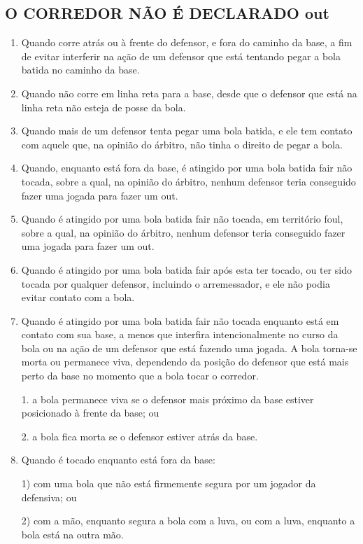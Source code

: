 \subsection{O CORREDOR NÃO É DECLARADO \gls{out}}
\begin{enumerate}[label=(\alph*)]
	\item   Quando corre atrás ou à frente do defensor, e fora do caminho da base, a fim de evitar interferir na ação de um defensor que está tentando pegar a bola batida no caminho da base.
	\item  Quando não corre em linha reta para a base, desde que o defensor que está na linha reta não esteja de posse da bola.
	\item  Quando mais de um defensor tenta pegar uma bola batida, e ele tem contato com aquele que, na opinião do árbitro, não tinha o direito de pegar a bola.
	\item  Quando, enquanto está fora da base, é atingido por uma bola batida \gls{fair} não tocada, sobre a qual, na opinião do árbitro, nenhum defensor teria conseguido fazer uma jogada para fazer um \gls{out}.
	\item  Quando é atingido por uma bola batida \gls{fair} não tocada, em território \gls{foul}, sobre a qual, na opinião do árbitro, nenhum defensor teria conseguido fazer uma jogada para fazer um \gls{out}.
	\item  Quando é atingido por uma bola batida \gls{fair} após esta ter tocado, ou ter sido tocada por qualquer defensor, incluindo o arremessador, e ele não podia evitar contato com a bola.
	\item   Quando é atingido por uma bola batida \gls{fair} não tocada enquanto está em contato com sua base, a menos que interfira intencionalmente no curso da bola
	 ou na ação de um defensor que está fazendo uma jogada. A bola torna-se morta ou permanece viva, dependendo da posição do defensor que está mais perto da base no momento que a bola tocar o corredor.

	1. a bola permanece viva se o defensor mais próximo da base estiver posicionado à frente da base; ou

	2. a bola fica morta se o defensor estiver atrás da base.

	\item   Quando é tocado enquanto está fora da base:

	1) com uma bola que não está firmemente segura por um jogador da defensiva; ou

	2) com a mão, enquanto segura a bola com a luva, ou com a luva, enquanto a bola está na outra mão.


\end{enumerate}
